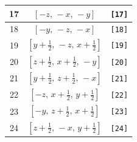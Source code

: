\documentclass[fleqn,8pt]{jsarticle}
\begin{document}
\begin{longtable}{ccc}
17 & $\left[ - z,\, - x,\, - y \right]$ & {\tt [17]} \\ \hline
18 & $\left[ - y,\, - z,\, - x \right]$ & {\tt [18]} \\ \hline
19 & $\left[ y + \frac{1}{2},\, - z,\, x + \frac{1}{2} \right]$ & {\tt [19]} \\ \hline
20 & $\left[ z + \frac{1}{2},\, x + \frac{1}{2},\, - y \right]$ & {\tt [20]} \\ \hline
21 & $\left[ y + \frac{1}{2},\, z + \frac{1}{2},\, - x \right]$ & {\tt [21]} \\ \hline
22 & $\left[ - z,\, x + \frac{1}{2},\, y + \frac{1}{2} \right]$ & {\tt [22]} \\ \hline
23 & $\left[ - y,\, z + \frac{1}{2},\, x + \frac{1}{2} \right]$ & {\tt [23]} \\ \hline
24 & $\left[ z + \frac{1}{2},\, - x,\, y + \frac{1}{2} \right]$ & {\tt [24]} \\
\end{longtable}
\end{document}
